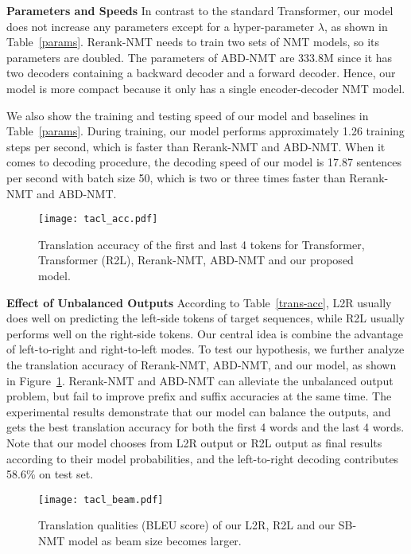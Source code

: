 \documentclass[11pt,a4paper]{article}
\begin{document}
\begin{CJK*}{UTF8}{gbsn}
\textbf{Parameters and Speeds}
In contrast to the standard Transformer, our model does not increase any parameters except for a hyper-parameter $\lambda$, as shown in Table~\ref{params}.
Rerank-NMT needs to train two sets of NMT models, so its parameters are doubled.
The parameters of ABD-NMT are 333.8M since it has two decoders containing a backward decoder and a forward decoder.
Hence, our model is more compact because it only has a single encoder-decoder NMT model.

We also show the training and testing speed of our model and baselines in Table~\ref{params}. 
During training, our model performs approximately 1.26 training steps per second, which is faster than Rerank-NMT and ABD-NMT.
When it comes to decoding procedure, the decoding speed of our model is 17.87 sentences per second with batch size 50, which is two or three times faster than Rerank-NMT and ABD-NMT.

\begin{figure}

	\setlength{\belowcaptionskip}{-0.2cm}
    \centering
    \texttt{[image: tacl\_acc.pdf]}
    \caption{Translation accuracy of the first and last 4 tokens for Transformer, Transformer (R2L), Rerank-NMT, ABD-NMT and our proposed model.
    }\label{tacl-acc-3}
\end{figure}



\textbf{Effect of Unbalanced Outputs}
According to Table~\ref{trans-acc}, L2R usually does well on predicting the left-side tokens of target sequences, while R2L usually performs well on the right-side tokens.
Our central idea is combine the advantage of left-to-right and right-to-left modes. To test our hypothesis, we further analyze the translation accuracy of Rerank-NMT, ABD-NMT, and our model, as shown in Figure~\ref{tacl-acc-3}. 
Rerank-NMT and ABD-NMT can alleviate the unbalanced output problem, but fail to improve prefix and suffix accuracies at the same time. 
The experimental results demonstrate that our model can balance the outputs, and gets the best translation accuracy for both the first 4 words and the last 4 words.
Note that our model chooses from L2R output or R2L output as final results according to their model probabilities, and the left-to-right decoding contributes 58.6\% on test set.

\begin{figure}
	\setlength{\abovecaptionskip}{0cm}
	\setlength{\belowcaptionskip}{-0.2cm}
	\centering
	\texttt{[image: tacl\_beam.pdf]}
	\caption{ Translation qualities (BLEU score) of our L2R, R2L and our SB-NMT model as beam size becomes larger\footnotemark[12]. 
	}\label{tacl_beam}
\end{figure}


\end{CJK*}
\end{document}
